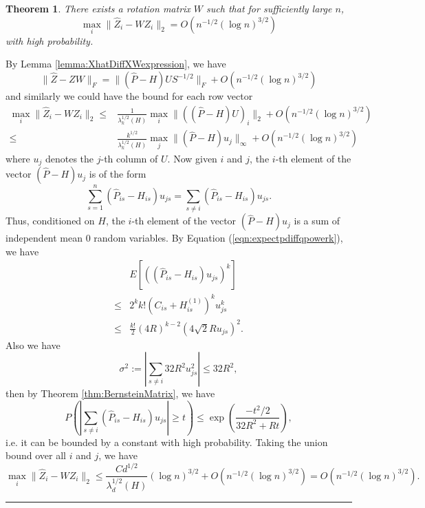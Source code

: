 \documentclass[a4paper]{article}
\newenvironment{proof}{{\bf Proof:  }}{\hfill\rule{2mm}{2mm}}
\newtheorem{theorem}[fact]{Theorem}
\begin{document}
\begin{theorem}
\label{thm:XhatDiffXW}
There exists a rotation matrix $W$ such that for sufficiently large $n$,
\[
	\max_i \| \hat{Z}_i - W Z_i \|_2 = O(n^{-1/2} (\log n)^{3/2})
\]
with high probability.
\end{theorem}
\begin{proof}
By Lemma \ref{lemma:XhatDiffXWexpression}, we have
\[
	\|\hat{Z} - Z W\|_F = \| (\hat{P} - H) U S^{-1/2} \|_F + O(n^{-1/2} (\log n)^{3/2})
\]
and similarly we could have the bound for each row vector
\begin{align*}
	\max_i \| \hat{Z}_i - W Z_i \|_2
    \le & \frac{1}{\lambda_k^{1/2}(H)} \max_i \| ((\hat{P} - H) U)_i \|_2 + O(n^{-1/2} (\log n)^{3/2}) \\
    \le & \frac{k^{1/2}}{\lambda_k^{1/2}(H)} \max_j \| (\hat{P} - H) u_j \|_{\infty} + O(n^{-1/2} (\log n)^{3/2})
\end{align*}
where $u_j$ denotes the $j$-th column of $U$. Now given $i$ and $j$, the $i$-th element of the vector $(\hat{P} - H) u_j$ is of the form
\[
	\sum_{s=1}^n (\hat{P}_{is} - H_{is}) u_{js} = \sum_{s \ne i} (\hat{P}_{is} - H_{is}) u_{js}.
\]
Thus, conditioned on $H$, the $i$-th element of the vector $(\hat{P} - H) u_j$ is a sum of independent mean 0 random variables.
By Equation (\ref{eqn:expectpdiffqpowerk}), we have
\begin{align*}
	& E\left[\left((\hat{P}_{is} - H_{is}) u_{js}\right)^k\right] \\ 
    \le & 2^k k! (C_{is} + H_{is}^{(1)})^k u_{js}^k \\
    \le & \frac{k!}{2} (4 R)^{k-2} (4\sqrt{2} R u_{js})^2.
\end{align*}
Also we have
\[
	\sigma^2 := |\sum_{s \ne i} 32 R^2 u_{js}^2|
    \le 32 R^2,
\]
then by Theorem \ref{thm:BernsteinMatrix}, we have
\[
	P \left( \left| \sum_{s \ne i} (\hat{P}_{is} - H_{is}) u_{js} \right| \ge t \right)
    \le \exp \left( \frac{-t^2/2}{32 R^2 + R t} \right),
\]
i.e. it can be bounded by a constant with high probability.
Taking the union bound over all $i$ and $j$, we have
\[
	\max_i \| \hat{Z}_i - W Z_i \|_2
    \le \frac{C d^{1/2}}{\lambda_d^{1/2}(H)} (\log n)^{3/2} + O(n^{-1/2} (\log n)^{3/2})
    = O(n^{-1/2} (\log n)^{3/2}).
\]
\end{proof}
\end{document}
